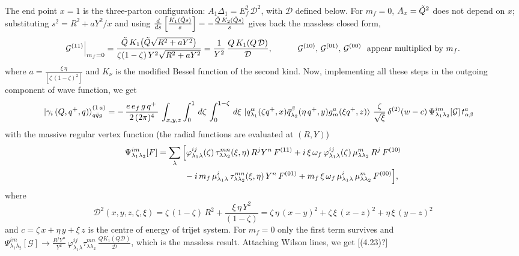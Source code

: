 \documentclass[9pt]{article}
\newcommand{\om}{\omega_{f}}                 %
\newcommand{\Ef}{E_{f}}                      %
\newcommand{\G}[1]{\mathcal{G}^{(#1)}}       %
\numberwithin{equation}{section}
\begin{document}
\begin{enumerate}
\begin{align}
\end{align}
The end point $x=1$ is the three-parton configuration: $A_{1}\Delta_{1} = \Ef^{2}\,\mathcal{D}^{2}$, with $\mathcal{D}$ defined below. For $m_{f}=0$, $A_{x}=\Tilde{Q}^{2}$ does not depend on $x$; substituting $s^{2}=R^{2}+aY^{2}/x$ and using $\frac{d}{ds}\left[\frac{K_{1}(\Tilde{Q}s)}{s}\right] = -\frac{\Tilde{Q}\,K_{2}(\Tilde{Q}s)}{s}$ gives back the massless closed form,
$$\G{11}\Big|_{m_{f}=0} = \frac{\Tilde{Q}\,K_{1}\!\left(\Tilde{Q}\sqrt{R^{2}+aY^{2}}\right)}{\zeta(1-\zeta)\,Y^{2}\sqrt{R^{2}+aY^{2}}} = \frac{1}{Y^{2}}\,\frac{Q\,K_{1}(Q\,\mathcal{D})}{\mathcal{D}},\hspace{3em} \G{10},\,\G{01},\,\G{00}\ \text{ appear multiplied by } m_{f}.$$
where $a = \frac{\xi\, \eta}{\left[\zeta\,(1-\zeta)^{2}\right]}$ and $K_{\nu}$ is the modified Bessel function of the second kind. Now, implementing all these steps in the outgoing component of wave function, we get
\begin{align}
    \ket{\gamma_{i}\,(Q,q^{+},q)}^{(1\,a)}_{q\Bar{q}g} &  = -\,\frac{e\,e_{f}\,g\,q^{+}\,}{2\,(2\pi)^{4}}\, \int_{x,y,z} \int_{0}^{1}\, d\zeta\, \int_{0}^{1-\zeta}\, d\xi\,\ket{q^{\alpha}_{\lambda_{1}}(\zeta q^{+},x)\Bar{q}^{\beta}_{\lambda_{2}}(\eta\,q^{+},y)g^{a}_{m}(\xi q^{+},z)}\, \frac{\zeta}{\sqrt{\xi}}\, \delta^{(2)}(w-c)\,\Psi^{im}_{\lambda_{1}\lambda_{2}}\!\left[\mathcal{G}\right] t^{a}_{\alpha\beta}
\end{align}
with the massive regular vertex function (the radial functions are evaluated at $(R,Y)$)
\begin{align}\label{eq:Psi}
    \Psi^{im}_{\lambda_{1}\lambda_{2}}\!\left[F\right] & = \sum_{\lambda}\Big[\varphi^{ij}_{\lambda_{1}\lambda}(\zeta)\,\tau^{mn}_{\lambda\lambda_{2}}(\xi,\eta)\,R^{j}Y^{n}\,F^{(11)} + i\,\xi\,\om\,\varphi^{ij}_{\lambda_{1}\lambda}(\zeta)\,\mu^{m}_{\lambda\lambda_{2}}\,R^{j}\,F^{(10)} \notag \\ & \hspace{3.2em} - i\,m_{f}\,\mu^{i}_{\lambda_{1}\lambda}\,\tau^{mn}_{\lambda\lambda_{2}}(\xi,\eta)\,Y^{n}\,F^{(01)} + m_{f}\,\xi\,\om\,\mu^{i}_{\lambda_{1}\lambda}\,\mu^{m}_{\lambda\lambda_{2}}\,F^{(00)}\Big],
\end{align}
where $$\mathcal{D}^{2}(x,y,z,\zeta,\xi) = \zeta\,(1-\zeta)\,R^{2} + \frac{\xi\,\eta\,Y^{2}}{(1-\zeta)} = \zeta\,\eta\,(x-y)^{2} + \zeta\,\xi\,(x-z)^{2} + \eta\,\xi\,(y-z)^{2}$$
and $c = \zeta\,x +\eta\, y + \xi\,z$ is the centre of energy of trijet system. For $m_{f}=0$ only the first term survives and $\Psi^{im}_{\lambda_{1}\lambda_{2}}[\mathcal{G}]\rightarrow \frac{R^{j}Y^{n}}{Y^{2}}\,\varphi^{ij}_{\lambda_{1}\lambda}\tau^{mn}_{\lambda\lambda_{2}}\,\frac{QK_{1}(Q\mathcal{D})}{\mathcal{D}}$, which is the massless result. Attaching  Wilson lines, we get  [(4.23)?]

\end{enumerate}
\end{document}
